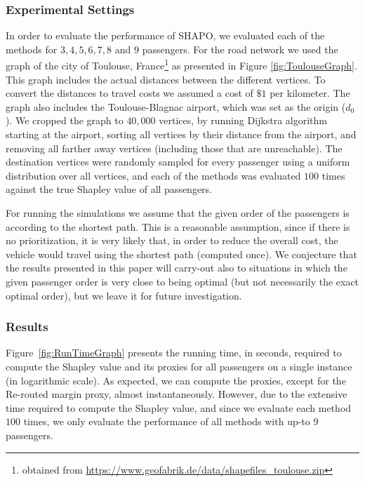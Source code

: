 \documentclass[sigconf]{aamas}
\begin{document}
\subsubsection{Experimental Settings}
In order to evaluate the performance of SHAPO, we evaluated each of the methods for $3,4,5,6,7,8$ and $9$ passengers. For the road network we used the graph of the city of Toulouse, France\footnote{obtained from \url{https://www.geofabrik.de/data/shapefiles_toulouse.zip}} as presented in Figure \ref{fig:ToulouseGraph}. This graph includes the actual distances between the different vertices. To convert the distances to travel costs we assumed a cost of $\$1$ per kilometer. The graph also includes the Toulouse-Blagnac airport, which was set as the origin ($d_0$).
We cropped the graph to $40,000$ vertices, by running Dijkstra algorithm~\cite{Dijkstra1959} starting at the airport, sorting all vertices by their distance from the airport, and removing all farther away vertices (including those that are unreachable). The destination vertices were randomly sampled for every passenger using a uniform distribution over all vertices, and each of the methods was evaluated $100$ times against the true Shapley value of all passengers. 

For running the simulations we assume that the given order of the passengers is according to the shortest path. This is a reasonable assumption, since if there is no prioritization, it is very likely that, in order to reduce the overall cost, the vehicle would travel using the shortest path (computed once). We conjecture that the results presented in this paper will carry-out also to situations in which the given passenger order is very close to being optimal (but not necessarily the exact optimal order), but we leave it for future investigation.

\subsubsection{Results}
Figure~\ref{fig:RunTimeGraph} presents the running time, in seconds, required to compute the Shapley value and its proxies for all passengers on a single instance (in logarithmic scale). As expected, we can compute the proxies, except for the Re-routed margin proxy, almost instantaneously. 
However, due to the extensive time required to compute the Shapley value, and since we evaluate each method $100$ times, we only evaluate the performance of all methods with up-to 9 passengers. 
\end{document}
